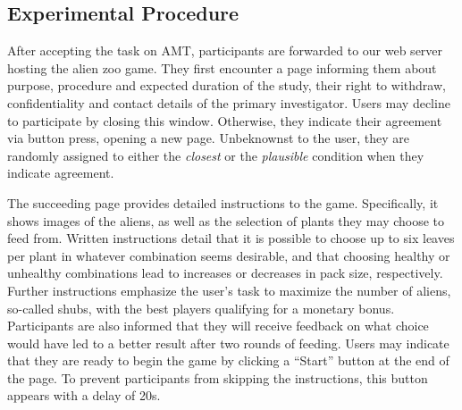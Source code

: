 \subsection{Experimental Procedure}\label{subsec:experimental-procedure}

After accepting the task on \gls{AMT}, participants are forwarded to our web server hosting the alien zoo game.
They first encounter a page informing them about purpose, procedure and expected duration of the study, their right to withdraw, confidentiality and contact details of the primary investigator.
Users may decline to participate by closing this window.
Otherwise, they indicate their agreement via button press, opening a new page.
Unbeknownst to the user, they are randomly assigned to either the \textit{closest} or the \textit{plausible} condition when they indicate agreement.

The succeeding page provides detailed instructions to the game. 
Specifically, it shows images of the aliens, as well as the selection of plants they may choose to feed from.
Written instructions detail that it is possible to choose up to six leaves per plant in whatever combination seems desirable, and that choosing healthy or unhealthy combinations lead to increases or decreases in pack size, respectively.
Further instructions emphasize the user's task to maximize the number of aliens, so-called shubs, with the best players qualifying for a monetary bonus.
Participants are also informed that they will receive feedback on what choice would have led to a better result after two rounds of feeding.
Users may indicate that they are ready to begin the game by clicking a ``Start'' button at the end of the page.
To prevent participants from skipping the instructions, this button appears with a delay of 20s.

